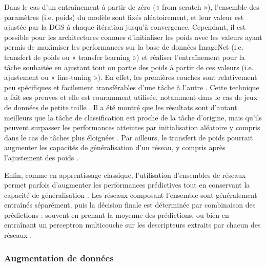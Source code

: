 Dans le cas d’un entraînement à partir de zéro (« from scratch »), l’ensemble des paramètres (i.e. poids) du modèle sont fixés aléatoirement, et leur valeur est ajustée par la DGS à chaque itération jusqu’à convergence. Cependant, il est possible pour les architectures connues d’initialiser les poids avec les valeurs ayant permis de maximiser les performances sur la base de données ImageNet (i.e. transfert de poids ou « transfer learning ») et réaliser l’entraînement pour la tâche souhaitée en ajustant tout ou partie des poids à partir de ces valeurs (i.e. ajustement ou « fine-tuning »). En effet, les premières couches sont relativement peu spécifiques et facilement transférables d’une tâche à l’autre \citep{yosinski_how_2014}. Cette technique a fait ses preuves \citep{huh_what_2016} et elle est couramment utilisée, notamment dans le cas de jeux de données de petite taille \citep{ng_deep_2015}. Il a été montré que les résultats sont d’autant meilleurs que la tâche de classification est proche de la tâche d’origine, mais qu’ils peuvent surpasser les performances atteintes par initialisation aléatoire y compris dans le cas de tâches plus éloignées \citep{yosinski_how_2014}. Par ailleurs, le transfert de poids pourrait augmenter les capacités de généralisation d’un réseau, y compris après l’ajustement des poids \citep{yosinski_how_2014}.

Enfin, comme en apprentissage classique, l’utilisation d’ensembles de réseaux permet parfois d’augmenter les performances prédictives tout en conservant la capacité de généralisation \citep{mehdipour_ghazi_open-set_2016, perez_solo_2019}. Les réseaux composant l’ensemble sont généralement entraînés séparément, puis la décision finale est déterminée par combinaison des prédictions : souvent en prenant la moyenne des prédictions, ou bien en entraînant un perceptron multicouche sur les descripteurs extraits par chacun des réseaux \citep{rokach_ensemble-based_2010}.

\subsubsection{Augmentation de données}

